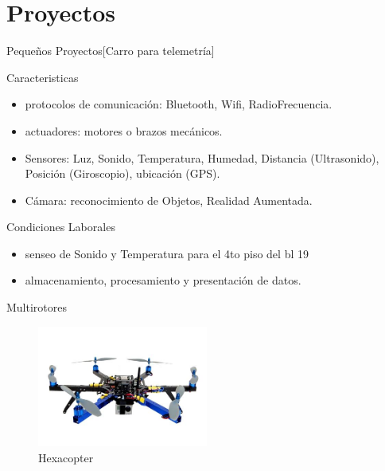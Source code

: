 \section{Proyectos}

\begin{frame}{Pequeños Proyectos}[Carro para telemetría]
	

\end{frame} 
     
\begin{frame}{Caracteristicas}
	\begin{itemize}
		\item protocolos de comunicación: Bluetooth, Wifi, RadioFrecuencia.
		\item	actuadores:  motores o brazos mecánicos.
		\item 	Sensores: Luz, Sonido, Temperatura, Humedad, Distancia (Ultrasonido), Posición (Giroscopio), ubicación (GPS).
		\item 	Cámara: reconocimiento de Objetos, Realidad Aumentada. 
	\end{itemize}
\end{frame}

\begin{frame}{Condiciones Laborales}
	\begin{itemize}
	 		\item senseo de Sonido y Temperatura para el 4to piso del bl 19
	 		\item almacenamiento, procesamiento y presentación de datos.
	 	\end{itemize} 	

\end{frame}


\begin{frame}{Multirotores}
	
	\begin{figure}[H]
		\centering
		\includegraphics[width=0.5\textwidth]{imgs/ardu-hexaARF-gopro}
		\caption{Hexacopter}
	\end{figure}
	
\end{frame}
